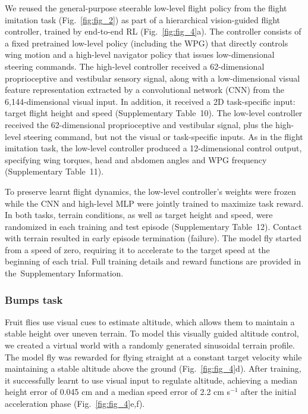 \documentclass[sn-mathphys-num]{sn-jnl}%
\theoremstyle{thmstyleone}%
\theoremstyle{thmstyletwo}%
\theoremstyle{thmstylethree}%
\begin{document}
We reused the general-purpose steerable low-level flight policy from the flight imitation task (Fig.~\ref{fig:fig_2}) as part of a hierarchical vision-guided flight controller, trained by end-to-end RL (Fig.~\ref{fig:fig_4}a). 
The controller consists of a fixed pretrained low-level policy (including the WPG) that directly controls wing motion and a high-level navigator policy that issues low-dimensional steering commands. 
The high-level controller received a 62-dimensional proprioceptive and vestibular sensory signal, along with a low-dimensional visual feature representation extracted by a convolutional network (CNN) from the 6,144-dimensional visual input. 
In addition, it received a 2D task-specific input: target flight height and speed (Supplementary Table 10). 
The low-level controller received the 62-dimensional proprioceptive and vestibular signal, plus the high-level steering command, but not the visual or task-specific inputs. 
As in the flight imitation task, the low-level controller produced a 12-dimensional control output, specifying wing torques, head and abdomen angles and WPG frequency (Supplementary Table 11).



To preserve learnt flight dynamics, the low-level controller's weights were frozen while the CNN and high-level MLP were jointly trained to maximize task reward. 
In both tasks, terrain conditions, as well as target height and speed, were randomized in each training and test episode (Supplementary Table 12). 
Contact with terrain resulted in early episode termination (failure). 
The model fly started from a speed of zero, requiring it to accelerate to the target speed at the beginning of each trial. 
Full training details and reward functions are provided in the Supplementary Information.


\subsubsection{Bumps task}

Fruit flies use visual cues to estimate altitude, which allows them to maintain a stable height over uneven terrain\cite{straw2010visual}. 
To model this visually guided altitude control, we created a virtual world with a randomly generated sinusoidal terrain profile. 
The model fly was rewarded for flying straight at a constant target velocity while maintaining a stable altitude above the ground (Fig.~\ref{fig:fig_4}d). 
After training, it successfully learnt to use visual input to regulate altitude, achieving a median height error of 0.045 cm and a median speed error of 2.2 cm s$ ^{-1} $ after the initial acceleration phase (Fig.~\ref{fig:fig_4}e,f).
\end{document}
